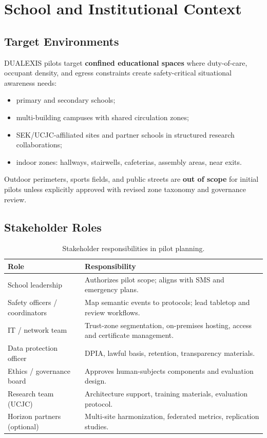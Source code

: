 \section{School and Institutional Context}
\label{sec:school-context}

\subsection{Target Environments}

DUALEXIS pilots target \textbf{confined educational spaces} where duty-of-care, occupant
density, and egress constraints create safety-critical situational awareness needs:

\begin{itemize}[noitemsep]
  \item primary and secondary schools;
  \item multi-building campuses with shared circulation zones;
  \item SEK/UCJC-affiliated sites and partner schools in structured research collaborations;
  \item indoor zones: hallways, stairwells, cafeterias, assembly areas, near exits.
\end{itemize}

Outdoor perimeters, sports fields, and public streets are \textbf{out of scope} for initial
pilots unless explicitly approved with revised zone taxonomy and governance review.

\subsection{Stakeholder Roles}

\begin{table}[htbp]
  \centering
  \caption{Stakeholder responsibilities in pilot planning.}
  \label{tab:stakeholders}
  \small
  \begin{tabular}{@{}p{3.0cm}p{9.0cm}@{}}
    \toprule
    Role & Responsibility \\
    \midrule
    School leadership &
      Authorizes pilot scope; aligns with SMS and emergency plans. \\
    Safety officers / coordinators &
      Map semantic events to protocols; lead tabletop and review workflows. \\
    IT / network team &
      Trust-zone segmentation, on-premises hosting, access and certificate management. \\
    Data protection officer &
      DPIA, lawful basis, retention, transparency materials. \\
    Ethics / governance board &
      Approves human-subjects components and evaluation design. \\
    Research team (UCJC) &
      Architecture support, training materials, evaluation protocol. \\
    Horizon partners (optional) &
      Multi-site harmonization, federated metrics, replication studies. \\
    \bottomrule
  \end{tabular}
\end{table}

